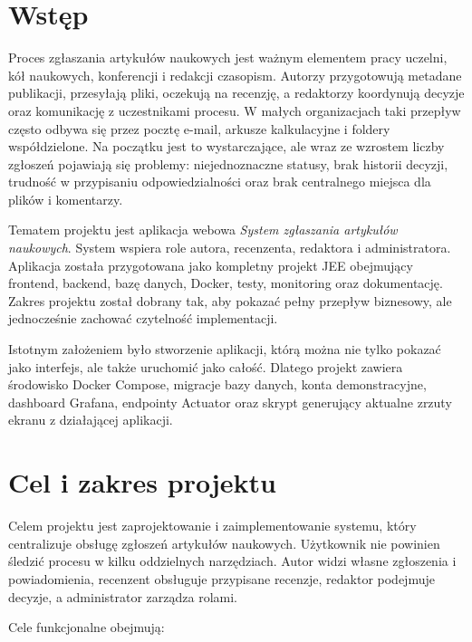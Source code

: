 \documentclass[times]{san}
\begin{document}
\maketitlepage
\spistresci

\section{Wstęp}

Proces zgłaszania artykułów naukowych jest ważnym elementem pracy uczelni, kół naukowych, konferencji i redakcji czasopism. Autorzy przygotowują metadane publikacji, przesyłają pliki, oczekują na recenzję, a redaktorzy koordynują decyzje oraz komunikację z uczestnikami procesu. W małych organizacjach taki przepływ często odbywa się przez pocztę e-mail, arkusze kalkulacyjne i foldery współdzielone. Na początku jest to wystarczające, ale wraz ze wzrostem liczby zgłoszeń pojawiają się problemy: niejednoznaczne statusy, brak historii decyzji, trudność w przypisaniu odpowiedzialności oraz brak centralnego miejsca dla plików i komentarzy.

Tematem projektu jest aplikacja webowa \textit{System zgłaszania artykułów naukowych}. System wspiera role autora, recenzenta, redaktora i administratora. Aplikacja została przygotowana jako kompletny projekt JEE obejmujący frontend, backend, bazę danych, Docker, testy, monitoring oraz dokumentację. Zakres projektu został dobrany tak, aby pokazać pełny przepływ biznesowy, ale jednocześnie zachować czytelność implementacji.

Istotnym założeniem było stworzenie aplikacji, którą można nie tylko pokazać jako interfejs, ale także uruchomić jako całość. Dlatego projekt zawiera środowisko Docker Compose, migracje bazy danych, konta demonstracyjne, dashboard Grafana, endpointy Actuator oraz skrypt generujący aktualne zrzuty ekranu z działającej aplikacji.

\section{Cel i zakres projektu}

Celem projektu jest zaprojektowanie i zaimplementowanie systemu, który centralizuje obsługę zgłoszeń artykułów naukowych. Użytkownik nie powinien śledzić procesu w kilku oddzielnych narzędziach. Autor widzi własne zgłoszenia i powiadomienia, recenzent obsługuje przypisane recenzje, redaktor podejmuje decyzje, a administrator zarządza rolami.

Cele funkcjonalne obejmują:
\end{document}
